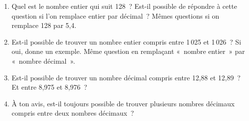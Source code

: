 \begin{activite}
\begin{partie}[Intercaler]
\begin{enumerate}
 \item Quel est le nombre entier qui suit 128 ? Est-il possible de répondre à cette question si l'on remplace entier par décimal ?
Mêmes questions si on remplace 128 par 5,4.
 \item Est-il possible de trouver un nombre entier compris entre 1\,025 et 1\,026 ? Si oui, donne un exemple.
Même question en remplaçant « nombre entier » par « nombre décimal ».
 \item Est-il possible de trouver un nombre décimal compris entre 12,88 et 12,89 ? Et entre 8,975 et 8,976 ?
 \item À ton avis, est-il toujours possible de trouver plusieurs nombres décimaux compris entre deux nombres décimaux ?
 \end{enumerate}
\end{partie}

\end{activite}



